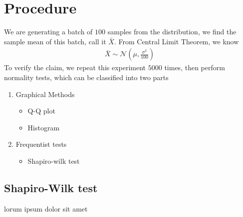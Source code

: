 \documentclass{article}
\begin{document}
\section{Procedure}
We are generating a batch of $100$ samples from the distribution, we find the sample mean of this batch, call it $\bar{X}$. From Central Limit Theorem, we know
\begin{align}
    \bar{X} \sim \mathcal{N}(\mu, \frac{\sigma^2}{100})
\end{align}
To verify the claim, we repeat this experiment $5000$ times, then perform normality tests, which can be classified into two parts
\begin{enumerate}
    \item Graphical Methods
    \begin{itemize}
        \item Q-Q plot
        \item Histogram
    \end{itemize}
    \item{Frequentist tests}
    \begin{itemize}
        \item Shapiro-wilk test
    \end{itemize}
\end{enumerate}

\subsection{Shapiro-Wilk test}
lorum ipsum dolor sit amet
\end{document}
